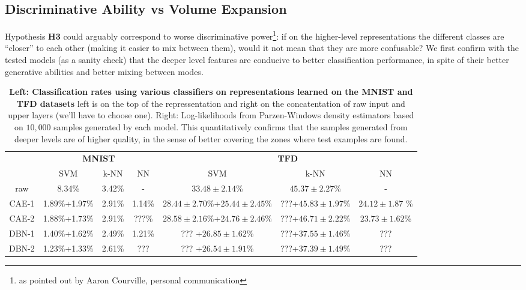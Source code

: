 \vspace*{-1mm}
\subsection{Discriminative Ability vs Volume Expansion}
\vspace*{-1mm}

Hypothesis {\bf H3} could arguably correspond to worse discriminative 
power\footnote{\scriptsize as pointed out by Aaron Courville, personal communication}:
if on the higher-level representations the different classes are ``closer''
to each other (making it easier to mix between them), would it not mean that they
are more confusable? We first confirm with the tested models (as a sanity check)
that the deeper level features are conducive to better classification performance,
in spite of their better generative abilities and better mixing between modes.

\begin{table}[ht]
  \begin{center}
\begin{tabular}{c|c|c|c||c|c|c|}
& \multicolumn{3}{|c||}{\bf MNIST} & \multicolumn{3}{c|}{\bf TFD}\\
& SVM & k-NN & NN & SVM & k-NN & NN \\ \hline
raw   & 8.34\%         & 3.42\% & -      & $33.48\pm 2.14$\% & $45.37\pm2.27$\% & -\\ \hline
CAE-1 & 1.89\%+1.97\%  & 2.91\% & 1.14\% & $28.44\pm2.70$\%+$25.44\pm2.45$\% & ???+$45.83\pm1.97$\% & $24.12\pm1.87$ \%\\
CAE-2 & 1.88\%+1.73\%  & 2.91\% & ???\%  & $28.58\pm2.16$\%+$24.76\pm2.46$\% & ???+$46.71\pm2.22$\% & $23.73\pm1.62$\% \\ \hline
DBN-1 & 1.40\%+1.62\%  & 2.49\% & 1.21\% & ???             +$26.85\pm1.62$\% & ???+$37.55\pm1.46$\%  & ???\\
DBN-2 & 1.23\%+1.33\%  & 2.61\% & ???    & ???             +$26.54\pm1.91$\% & ???+$37.39\pm1.49$\%  & ??? \\\hline
\end{tabular}

\caption{ {\bf Left: Classification rates using various classifiers on
representations learned on the MNIST and TFD datasets} left is on the
top of the repressentation and right on the concatentation of raw
input and upper layers (we'll have to choose one). Right:
Log-likelihoods from Parzen-Windows density estimators based on
$10,000$ samples generated by each model. This quantitatively confirms
that the samples generated from deeper levels are of higher quality,
in the sense of better covering the zones where test examples are
found. } \label{tab:res-knn-svm}

\end{center}

\end{table}
\fi

